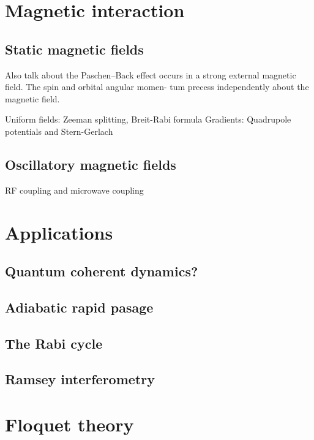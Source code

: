 



\section{Magnetic interaction}
\subsection{Static magnetic fields}
Also talk about the Paschen–Back effect occurs in a strong external magnetic field. The spin and orbital angular momen- tum precess independently about the magnetic field.

Uniform fields: Zeeman splitting, Breit-Rabi formula
Gradients: Quadrupole potentials and Stern-Gerlach

\subsection{Oscillatory magnetic fields}
\label{seq:rf_coupling}
RF coupling and microwave coupling



\section{Applications}
\subsection{Quantum coherent dynamics?}
\subsection{Adiabatic rapid pasage}
\label{sec:arp}
\subsection{The Rabi cycle}
\subsection{Ramsey interferometry}



\section{Floquet theory}



